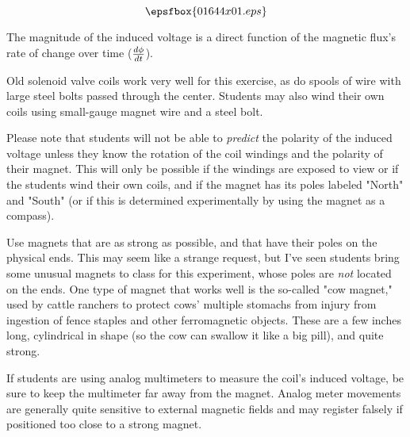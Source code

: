 

$$\epsfbox{01644x01.eps}$$

\vfil \eject






The magnitude of the induced voltage is a direct function of the magnetic flux's rate of change over time ($d \phi \over dt$).







Old solenoid valve coils work very well for this exercise, as do spools of wire with large steel bolts passed through the center.  Students may also wind their own coils using small-gauge magnet wire and a steel bolt.

Please note that students will not be able to {\it predict} the polarity of the induced voltage unless they know the rotation of the coil windings and the polarity of their magnet.  This will only be possible if the windings are exposed to view or if the students wind their own coils, and if the magnet has its poles labeled "North" and "South" (or if this is determined experimentally by using the magnet as a compass).

Use magnets that are as strong as possible, and that have their poles on the physical ends.  This may seem like a strange request, but I've seen students bring some unusual magnets to class for this experiment, whose poles are {\it not} located on the ends.  One type of magnet that works well is the so-called "cow magnet," used by cattle ranchers to protect cows' multiple stomachs from injury from ingestion of fence staples and other ferromagnetic objects.  These are a few inches long, cylindrical in shape (so the cow can swallow it like a big pill), and quite strong.  

If students are using analog multimeters to measure the coil's induced voltage, be sure to keep the multimeter far away from the magnet.  Analog meter movements are generally quite sensitive to external magnetic fields and may register falsely if positioned too close to a strong magnet.




